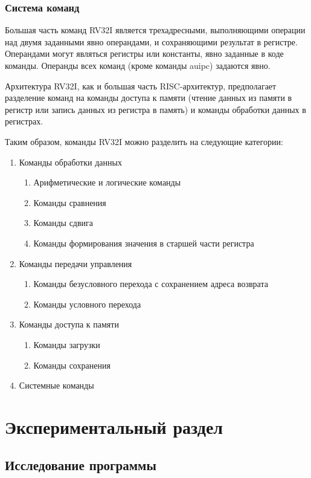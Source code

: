 \subsection{Система команд}

Большая часть команд RV32I является трехадресными, выполняющими операции над двумя заданными явно операндами, и сохраняющими результат в регистре. Операндами могут являться регистры или константы, явно заданные в коде команды. Операнды всех команд (кроме команды auipc) задаются явно.

Архитектура RV32I, как и большая часть RISC-архитектур, предполагает разделение команд на команды доступа к памяти (чтение данных из памяти в регистр или запись данных из регистра в память) и команды обработки данных в регистрах.

Таким образом, команды RV32I можно разделить на следующие категории:

\begin{enumerate}
	\item Команды обработки данных
	\begin{enumerate}
		\item Арифметические и логические команды
		\item Команды сравнения
		\item Команды сдвига
		\item Команды формирования значения в старшей части регистра
	\end{enumerate}
	\item Команды передачи управления
	\begin{enumerate}
		\item Команды безусловного перехода с сохранением адреса возврата
		\item Команды условного перехода
	\end{enumerate}
	\item Команды доступа к памяти
	\begin{enumerate}
		\item Команды загрузки
		\item Команды сохранения
	\end{enumerate}
	\item Системные команды
\end{enumerate}

\chapter{Экспериментальный раздел}

\section{Исследование программы}

